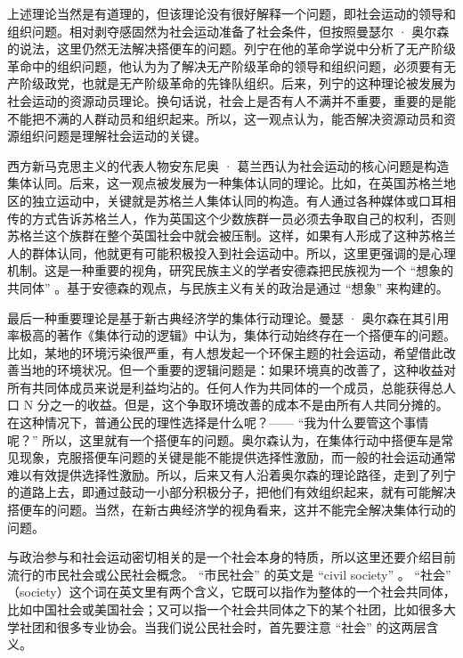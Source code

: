 上述理论当然是有道理的，但该理论没有很好解释一个问题，即社会运动的领导和组织问题。相对剥夺感固然为社会运动准备了社会条件，但按照曼瑟尔 · 奥尔森的说法，这里仍然无法解决搭便车的问题。列宁在他的革命学说中分析了无产阶级革命中的组织问题，他认为为了解决无产阶级革命的领导和组织问题，必须要有无产阶级政党，也就是无产阶级革命的先锋队组织。后来，列宁的这种理论被发展为社会运动的资源动员理论。换句话说，社会上是否有人不满并不重要，重要的是能不能把不满的人群动员和组织起来。所以，这一观点认为，能否解决资源动员和资源组织问题是理解社会运动的关键。

西方新马克思主义的代表人物安东尼奥 · 葛兰西认为社会运动的核心问题是构造集体认同。后来，这一观点被发展为一种集体认同的理论。比如，在英国苏格兰地区的独立运动中，关键就是苏格兰人集体认同的构造。有人通过各种媒体或口耳相传的方式告诉苏格兰人，作为英国这个少数族群一员必须去争取自己的权利，否则苏格兰这个族群在整个英国社会中就会被压制。这样，如果有人形成了这种苏格兰人的群体认同，他就更有可能积极投入到社会运动中。所以，这里更强调的是心理机制。这是一种重要的视角，研究民族主义的学者安德森把民族视为一个 “想象的共同体” 。基于安德森的观点，与民族主义有关的政治是通过 “想象” 来构建的。

最后一种重要理论是基于新古典经济学的集体行动理论。曼瑟 · 奥尔森在其引用率极高的著作《集体行动的逻辑》中认为，集体行动始终存在一个搭便车的问题。比如，某地的环境污染很严重，有人想发起一个环保主题的社会运动，希望借此改善当地的环境状况。但一个重要的逻辑问题是：如果环境真的改善了，这种收益对所有共同体成员来说是利益均沾的。任何人作为共同体的一个成员，总能获得总人口 N 分之一的收益。但是，这个争取环境改善的成本不是由所有人共同分摊的。在这种情况下，普通公民的理性选择是什么呢？—— “我为什么要管这个事情呢？” 所以，这里就有一个搭便车的问题。奥尔森认为，在集体行动中搭便车是常见现象，克服搭便车问题的关键是能不能提供选择性激励，而一般的社会运动通常难以有效提供选择性激励。所以，后来又有人沿着奥尔森的理论路径，走到了列宁的道路上去，即通过鼓动一小部分积极分子，把他们有效组织起来，就有可能解决搭便车的问题。当然，在新古典经济学的视角看来，这并不能完全解决集体行动的问题。


与政治参与和社会运动密切相关的是一个社会本身的特质，所以这里还要介绍目前流行的市民社会或公民社会概念。 “市民社会” 的英文是 “civil society” 。 “社会” （society）这个词在英文里有两个含义，它既可以指作为整体的一个社会共同体，比如中国社会或美国社会；又可以指一个社会共同体之下的某个社团，比如很多大学社团和很多专业协会。当我们说公民社会时，首先要注意 “社会” 的这两层含义。

